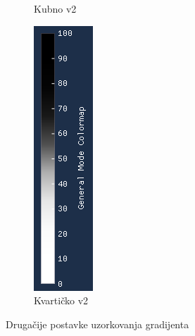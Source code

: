 \documentclass[times, utf8, diplomski]{fer}
\begin{document}
\begin{figure} [H]
\begin{subfigure}[h]{0.17\textwidth}
         \caption{Kubno v2}
         \label{fig:cubic_symmetrical_legend}
     \end{subfigure}
     \hfill
     \begin{subfigure}[h]{0.17\textwidth}
         \centering
         \includegraphics[width=\textwidth]{quartic_symmetrical_colormap.png}
         \caption{Kvartičko v2}
         \label{fig:quartic_symmetrical_legend}
     \end{subfigure}
        \caption{Drugačije postavke uzorkovanja gradijenta}
        \label{fig:colormap-legends}
\end{figure}
\end{document}
